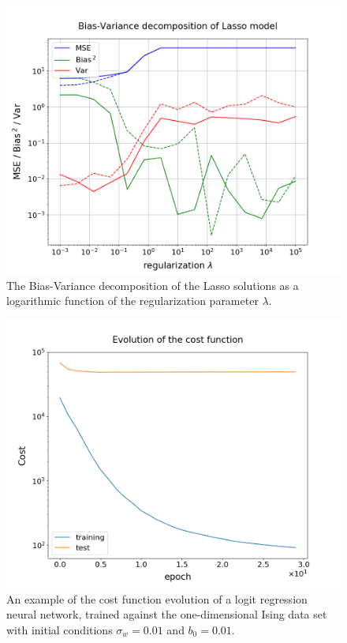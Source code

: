 \documentclass[nofootinbib,reprint,english]{revtex4-1}
\begin{document}
\clearpage

\begin{figure}[ht]
\centering
\includegraphics[scale=0.3]{../output/LinReg/BiasVarDecomp_Lasso_loglog.png}
\caption{The Bias-Variance decomposition of the Lasso solutions as a logarithmic function of the regularization parameter \(\lambda\).}\label{fig:LinReg_BiasVarDecomp_Lasso}
\end{figure}

\begin{figure}[ht]
\centering
\includegraphics[scale=0.3]{../output/NNReg/CostEvolution_logit0_reshaped.png}
\caption{An example of the cost function evolution of a logit regression neural network, trained against the one-dimensional Ising data set with initial conditions \(\sigma_w=0.01\) and \(b_0=0.01\).}\label{fig:NNReg_CostEvolution_example}
\end{figure}
\newpage
\end{document}
